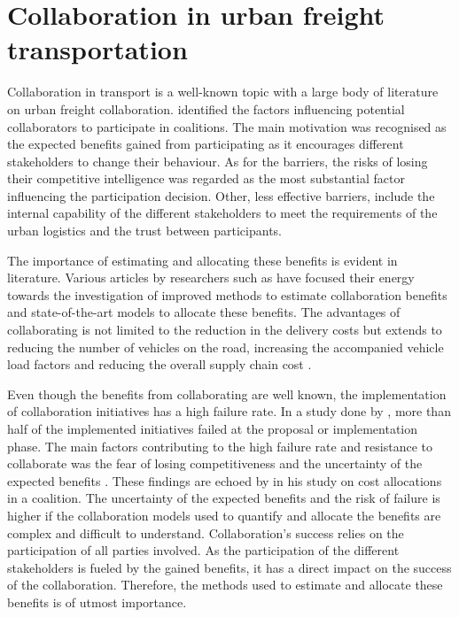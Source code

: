 \section{Collaboration in urban freight transportation}

Collaboration in transport is a well-known topic with a large body of literature on urban freight collaboration. \citet{lindawati2014collaboration} identified the factors influencing potential collaborators to participate in coalitions. The main motivation was recognised as the expected benefits gained from participating as it encourages different stakeholders to change their behaviour. As for the barriers, the risks of losing their competitive intelligence was regarded as the most substantial factor influencing the participation decision. Other, less effective barriers, include the internal capability of the different stakeholders to meet the requirements of the urban logistics and the trust between participants.\par

The importance of estimating and allocating these benefits is evident in literature. Various articles by researchers such as \citet{lozano2013cooperative,houghtalen2007designing,defryn2013gain,dai2012profit,audy2012empirical} have focused their energy towards the investigation of improved methods to estimate collaboration benefits and state-of-the-art models to allocate these benefits.
The advantages of collaborating is not limited to the reduction in the delivery costs but extends to reducing the number of vehicles on the road, increasing the accompanied vehicle load factors  \citep{janjevic2018investigating} and reducing the overall supply chain cost \citep{lozano2013cooperative}.\par
 
 Even though the benefits from collaborating are well known, the implementation of collaboration initiatives has a high failure rate. In a study done by \citet{quak2008sustainability}, more than half of the implemented initiatives failed at the proposal or implementation phase. The main factors contributing to the high failure rate and resistance to collaborate was the fear of losing competitiveness and the uncertainty of the expected benefits \citep{lindawati2014collaboration}. These findings are echoed by \citet{ozener2008allocating} in his study on cost allocations in a coalition. The uncertainty of the expected benefits and the risk of failure is higher if the collaboration models used to quantify and allocate the benefits are complex and difficult to understand. Collaboration's success relies on the participation of all parties involved. As the participation of the different stakeholders is fueled by the gained benefits, it has a direct impact on the success of the collaboration. Therefore, the methods used to estimate and allocate these benefits is of utmost importance. \par


